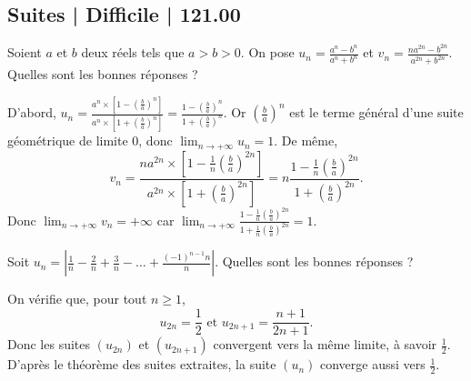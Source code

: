 \subsection{Suites | Difficile | 121.00}



\begin{question}

Soient $a$ et $b$ deux réels tels que $a>b>0$. On pose $\displaystyle u_n=\frac{a^n-b^n}{a^n+b^n}$ et $\displaystyle v_n=\frac{na^{2n}-b^{2n}}{a^{2n}+b^{2n}}$. Quelles sont les bonnes réponses ?
\begin{answers}  
\end{answers}
\begin{explanations}
D'abord, $\displaystyle u_n=\frac{a^n\times \left[1-\left(\frac{b}{a}\right)^n\right]}{a^n\times \left[1+\left(\frac{b}{a}\right)^n\right]}=\frac{1-\left(\frac{b}{a}\right)^n}{1+\left(\frac{b}{a}\right)^n}$. Or $\displaystyle \left(\frac{b}{a}\right)^n$ est le terme général d'une suite géométrique de limite $0$, donc $\displaystyle \lim _{n\to +\infty}u_n=1$. De même, 
$$\displaystyle v_n=\frac{na^{2n}\times \left[1-\frac{1}{n}\left(\frac{b}{a}\right)^{2n}\right]}{a^{2n}\times \left[1+\left(\frac{b}{a}\right)^{2n}\right]}=n\frac{1-\frac{1}{n}\left(\frac{b}{a}\right)^{2n}}{1+\left(\frac{b}{a}\right)^{2n}}.$$
Donc $\displaystyle \lim _{n\to +\infty}v_n=+\infty$ car $\displaystyle \lim _{n\to +\infty}\frac{1-\frac{1}{n}\left(\frac{b}{a}\right)^{2n}}{1+\frac{1}{n}\left(\frac{b}{a}\right)^{2n}}=1$.
\end{explanations}
\end{question}



\begin{question}

Soit $\displaystyle u_n=\left|\frac{1}{n}-\frac{2}{n}+\frac{3}{n}-\dots+\frac{(-1)^{n-1}n}{n}\right|$. Quelles sont les bonnes réponses ?
\begin{answers}  
\end{answers}
\begin{explanations}
On vérifie que, pour tout $n\geq 1$,
$$u_{2n}=\frac{1}{2}\mbox{ et }u_{2n+1}=\frac{n+1}{2n+1}.$$
Donc les suites $(u_{2n})$ et $(u_{2n+1})$ convergent vers la même limite, à savoir $\displaystyle \frac{1}{2}$. D'après le théorème des suites extraites, la suite $(u_n)$ converge aussi vers $\displaystyle \frac{1}{2}$.
\end{explanations}
\end{question}



